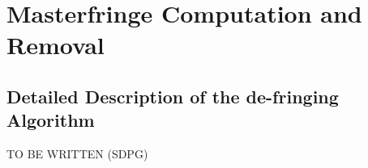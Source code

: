 \section{Masterfringe Computation and Removal}
\label{chap:algorithms:fringing}

\subsection{Detailed Description of the de-fringing Algorithm}
TO BE WRITTEN (SDPG)
